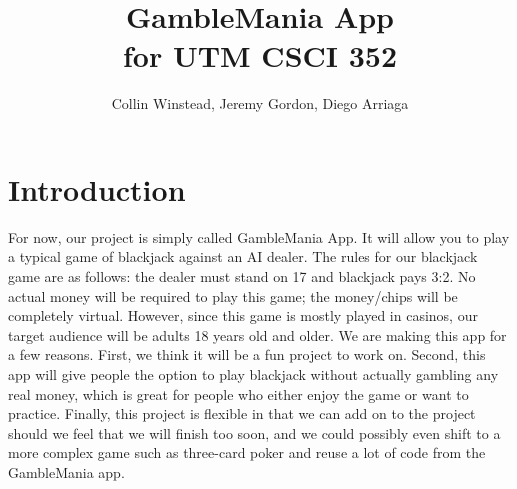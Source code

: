 \documentclass[10pt,conference,onecolumn,compsoc]{IEEEtran}
\begin{document}
\title{GambleMania App\\ for UTM CSCI 352}
%
%


\author{Collin Winstead, Jeremy Gordon, Diego Arriaga%
}



\maketitle



\IEEEdisplaynontitleabstractindextext

\IEEEpeerreviewmaketitle



\section{Introduction}


For now, our project is simply called GambleMania App. It will allow you to play a typical game of blackjack against an AI dealer. The rules for our blackjack game are as follows: the dealer must stand on 17 and blackjack pays 3:2. No actual money will be required to play this game; the money/chips will be completely virtual. However, since this game is mostly played in casinos, our target audience will be adults 18 years old and older. We are making this app for a few reasons. First, we think it will be a fun project to work on. Second, this app will give people the option to play blackjack without actually gambling any real money, which is great for people who either enjoy the game or want to practice. Finally, this project is flexible in that we can add on to the project should we feel that we will finish too soon, and we could possibly even shift to a more complex game such as three-card poker and reuse a lot of code from the GambleMania app.
\end{document}
